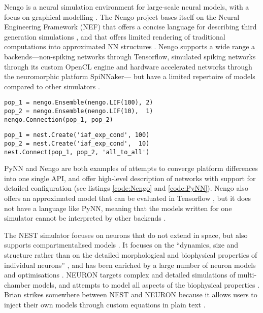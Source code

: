 \documentclass[report.tex]{subfiles}
\begin{document}
Nengo is a neural simulation environment for large-scale neural models, with
a focus on graphical modelling \cite{Eliasmith2015}. 
The Nengo project bases itself on the Neural Engineering Framework (NEF)
 that offers a concise language for
describing third generation simulations \cite{Bekolay2014}, and that
offers limited rendering of traditional computations into approximated
\gls{NN} structures \cite{Eliasmith2004, Eliasmith2015}.
Nengo supports a wide range a backends---non-spiking networks through Tensorflow,
simulated spiking networks through its custom \gls{OpenCL} engine and 
hardware accelerated networks through the neuromorphic platform SpiNNaker---
but have a limited repertoire of models compared to other simulators
\cite{Nengo2018}.

\begin{minipage}{\linewidth}
\begin{lstlisting}
pop_1 = nengo.Ensemble(nengo.LIF(100), 2)
pop_2 = nengo.Ensemble(nengo.LIF(10),  1)
nengo.Connection(pop_1, pop_2)
\end{lstlisting}
\end{minipage}

\begin{minipage}{\linewidth}
\begin{lstlisting}
pop_1 = nest.Create('iaf_exp_cond', 100)
pop_2 = nest.Create('iaf_exp_cond',  10)
nest.Connect(pop_1, pop_2, 'all_to_all')
\end{lstlisting} 
\end{minipage}

PyNN and Nengo are both examples of
attempts to converge platform differences into one single \gls{API}, and
offer high-level description of networks with support for detailed 
configuration (see listings \ref{code:Nengo} and \ref{code:PyNN}).
Nengo also offers an approximated model that can be evaluated in Tensorflow
\cite{Hunsberger2015}, but it does not have a language like PyNN, meaning
that the models written for one simulator cannot be interpreted by other
backends \cite{Nengo2018}.

The NEST simulator focuses on neurons that do not extend in space, 
but also supports compartmentalised models \cite{Gewaltig2007}.
It focuses on the ``dynamics, size and structure rather than on the detailed
morphological and biophysical properties of individual neurons''
\cite{Gewaltig2007}, and has been enriched by a large number of neuron models
and optimisations \cite{Blundell2018}.
NEURON targets complex and detailed simulations of multi-chamber models, and
attempts to model all aspects of the biophysical properties \cite{Carnevale2007}.
Brian strikes somewhere between NEST and NEURON because it allows users to
inject their own models through custom equations in plain text \cite{Goodman2013}.
\end{document}
